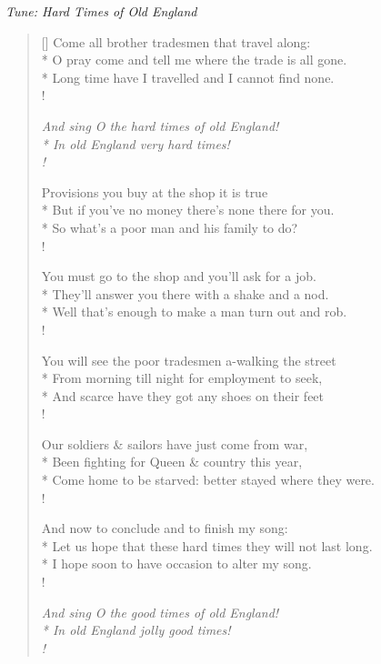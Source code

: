 \documentclass[MAIN]{subfiles}
\begin{document}
\bigskip

\begin{center}
{\it Tune: Hard Times of Old England}
\end{center}

\bigskip

\settowidth{\versewidth}{O pray come and tell me where the trade is all gone.}
\begin{verse}[\versewidth]
Come all brother tradesmen that travel along:\\*
O pray come and tell me where the trade is all gone.\\*
Long time have I travelled and I cannot find none.\\!

{\it And sing O the hard times of old England!\\*
In old England very hard times!\\!}

Provisions you buy at the shop it is true\\*
But if you've no money there's none there for you.\\*
So what's a poor man and his family to do?\\!

You must go to the shop and you'll ask for a job.\\*
They'll answer you there with a shake and a nod.\\*
Well that's enough to make a man turn out and rob.\\!

You will see the poor tradesmen a-walking the street\\*
From morning till night for employment to seek,\\*
And scarce have they got any shoes on their feet\\!

Our soldiers \& sailors have just come from war,\\*
Been fighting for Queen \& country this year,\\*
Come home to be starved: better stayed where they were.\\!

And now to conclude and to finish my song:\\*
Let us hope that these hard times they will not last long.\\*
I hope soon to have occasion to alter my song.\\!

{\it And sing O the good times of old England!\\*
In old England jolly good times!\\!}
\end{verse}
\end{document}
